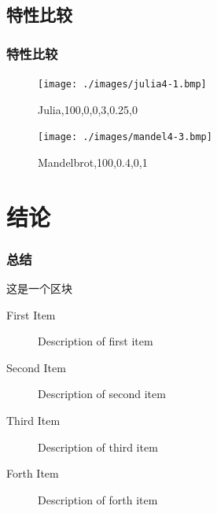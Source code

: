 \documentclass[8pt,c,compress,UTF8]{ctexbeamer}
\begin{document}
\subsection{特性比较}
\begin{frame} 
\frametitle{特性比较}

\begin{figure}[htb]
\centering
\begin{minipage}{0.45\linewidth}
\centering
\texttt{[image: ./images/julia4-1.bmp]}
\caption*{Julia,100,0,0,3,0.25,0}
\label{fig4-1}
\end{minipage}\hfill
\begin{minipage}{0.45\linewidth}
\centering
\texttt{[image: ./images/mandel4-3.bmp]}
\caption*{Mandelbrot,100,0.4,0,1}
\label{fig4-2}
\end{minipage}
\end{figure}

\end{frame}

\section{结论}
\begin{frame} 
\frametitle{总结}
\begin{block}{}
        这是一个区块
\end{block}
\begin{description}
\item[First Item] Description of first item
\item[Second Item] Description of second item
\item[Third Item] Description of third item
\item[Forth Item] Description of forth item
\end{description}
\end{frame}
\end{document}
